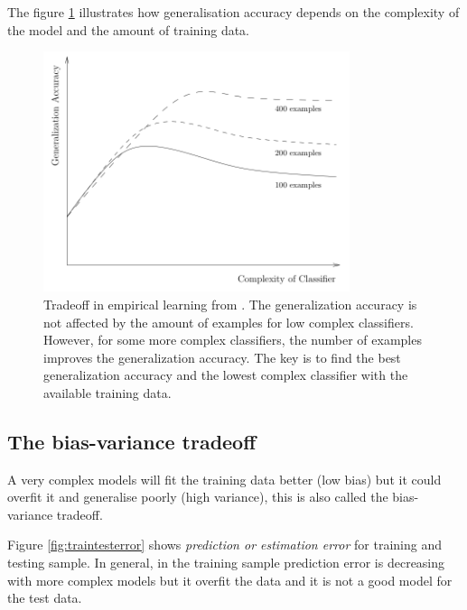 The figure \ref{fig:tradeoff} illustrates how generalisation
accuracy depends on the complexity of the model and the amount of training data.

\begin{figure}[!h]
  \centering
  \includegraphics[width=0.8\textwidth]{img/3tradeoff}
  \caption[Tradeoff in empirical learning ]{Tradeoff in empirical learning from \cite{dietterich2003}. The
generalization accuracy is not affected by the amount of examples for low
complex classifiers. However, for some more complex classifiers, the number of
examples improves the generalization accuracy. The key is to find the best
generalization accuracy and the lowest complex classifier with the available
training data. }
  \label{fig:tradeoff}
\end{figure}

\subsection{The bias-variance tradeoff} \label{sec:biasvar}

A very complex models will fit the training data better (low bias) but it could
overfit it and generalise poorly (high variance), this is also called the
bias-variance tradeoff.  

Figure \ref{fig:traintesterror} shows {\em prediction or estimation error} for
training and testing sample.  In general, in the training sample prediction
error is decreasing with more complex models but it overfit the data and it is
not a good model for the test data. 

